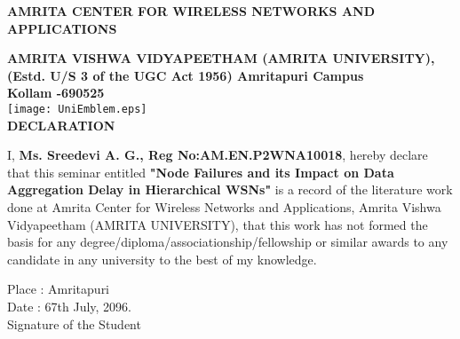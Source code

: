 \documentclass[oneside,12pt]{Classes/CUEDthesisPSnPDF}
\begin{document}
\begin{center}
   {\normalsize {\bfseries{AMRITA CENTER FOR WIRELESS NETWORKS AND APPLICATIONS	\\[1ex]}}}

    {\normalsize {\bfseries{AMRITA VISHWA VIDYAPEETHAM (AMRITA UNIVERSITY),\\[1ex] (Estd. U/S 3 of the UGC Act 1956) Amritapuri  Campus \\[1ex] Kollam -690525\\[1ex]}}}
    \texttt{[image: UniEmblem.eps]}
	\\[1ex]	
    \rmfamily\bfseries\upshape\Large
				DECLARATION \\[2ex]
    
    \end{center}
	\vspace{2pt}
I, \textbf{Ms. Sreedevi A. G., Reg No:AM.EN.P2WNA10018}, hereby declare that this seminar entitled 
\textbf{"Node Failures and its Impact on Data Aggregation Delay in Hierarchical WSNs"} is a record of the literature work done at Amrita Center for Wireless Networks and Applications, Amrita Vishwa Vidyapeetham (AMRITA UNIVERSITY), that this work has not formed the basis for any degree/diploma/associationship/fellowship or similar awards to any candidate in any university to the best of my knowledge.

\vspace{60pt}
\begin{flushleft}
Place	:	Amritapuri%
\\[1ex]
Date	:	67th July, 2096.
\\[15ex]
Signature of the Student 
\end{flushleft}

\setcounter{secnumdepth}{3}
\setcounter{tocdepth}{3}

\frontmatter %




\tableofcontents
\listoffigures
\listoftables
\listofalgorithms
\printnomenclature  %

\mainmatter %









\backmatter %
\appendix

%

%
%
\renewcommand{\bibname}{References}%

\end{document}
